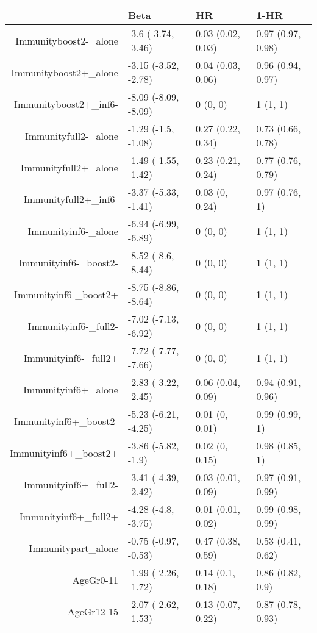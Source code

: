 \begin{table}[ht]
\centering
\begin{tabular}{rlll}
  \hline
 & Beta & HR & 1-HR \\ 
  \hline
Immunityboost2-\_alone & -3.6 (-3.74, -3.46) & 0.03 (0.02, 0.03) & 0.97 (0.97, 0.98) \\ 
  Immunityboost2+\_alone & -3.15 (-3.52, -2.78) & 0.04 (0.03, 0.06) & 0.96 (0.94, 0.97) \\ 
  Immunityboost2+\_inf6- & -8.09 (-8.09, -8.09) & 0 (0, 0) & 1 (1, 1) \\ 
  Immunityfull2-\_alone & -1.29 (-1.5, -1.08) & 0.27 (0.22, 0.34) & 0.73 (0.66, 0.78) \\ 
  Immunityfull2+\_alone & -1.49 (-1.55, -1.42) & 0.23 (0.21, 0.24) & 0.77 (0.76, 0.79) \\ 
  Immunityfull2+\_inf6- & -3.37 (-5.33, -1.41) & 0.03 (0, 0.24) & 0.97 (0.76, 1) \\ 
  Immunityinf6-\_alone & -6.94 (-6.99, -6.89) & 0 (0, 0) & 1 (1, 1) \\ 
  Immunityinf6-\_boost2- & -8.52 (-8.6, -8.44) & 0 (0, 0) & 1 (1, 1) \\ 
  Immunityinf6-\_boost2+ & -8.75 (-8.86, -8.64) & 0 (0, 0) & 1 (1, 1) \\ 
  Immunityinf6-\_full2- & -7.02 (-7.13, -6.92) & 0 (0, 0) & 1 (1, 1) \\ 
  Immunityinf6-\_full2+ & -7.72 (-7.77, -7.66) & 0 (0, 0) & 1 (1, 1) \\ 
  Immunityinf6+\_alone & -2.83 (-3.22, -2.45) & 0.06 (0.04, 0.09) & 0.94 (0.91, 0.96) \\ 
  Immunityinf6+\_boost2- & -5.23 (-6.21, -4.25) & 0.01 (0, 0.01) & 0.99 (0.99, 1) \\ 
  Immunityinf6+\_boost2+ & -3.86 (-5.82, -1.9) & 0.02 (0, 0.15) & 0.98 (0.85, 1) \\ 
  Immunityinf6+\_full2- & -3.41 (-4.39, -2.42) & 0.03 (0.01, 0.09) & 0.97 (0.91, 0.99) \\ 
  Immunityinf6+\_full2+ & -4.28 (-4.8, -3.75) & 0.01 (0.01, 0.02) & 0.99 (0.98, 0.99) \\ 
  Immunitypart\_alone & -0.75 (-0.97, -0.53) & 0.47 (0.38, 0.59) & 0.53 (0.41, 0.62) \\ 
  AgeGr0-11 & -1.99 (-2.26, -1.72) & 0.14 (0.1, 0.18) & 0.86 (0.82, 0.9) \\ 
  AgeGr12-15 & -2.07 (-2.62, -1.53) & 0.13 (0.07, 0.22) & 0.87 (0.78, 0.93) \\ 

\end{tabular}
\end{table}
